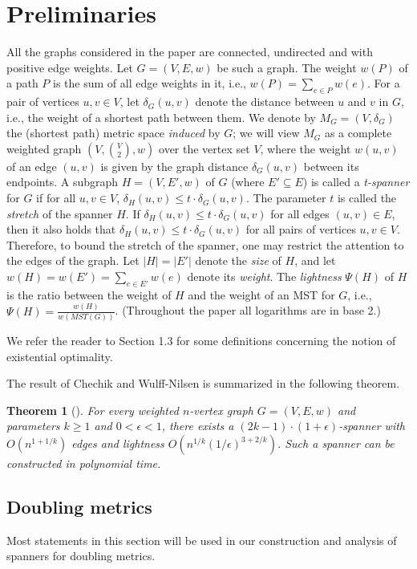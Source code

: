 \documentclass[11pt,letterpaper]{article}
\newtheorem{theorem}{Theorem}
\newcommand{\eps}{\epsilon}
\begin{document}
\section{Preliminaries}\label{sec:pre}
All the graphs considered in the paper are connected, undirected and with positive edge weights. Let $G=(V,E,w)$ be such a graph.
The weight $w(P)$ of a path $P$ is the sum of all edge weights in it, i.e., $w(P) = \sum_{e \in P} w(e)$.
For a pair of vertices $u,v \in V$, let $\delta_G(u,v)$ denote the distance between $u$ and $v$ in $G$, i.e., the weight of a shortest path between them.
We denote by $M_G = (V,\delta_G)$ the (shortest path) metric space \emph{induced} by $G$; we will view $M_G$ as a complete weighted graph $(V, {V \choose 2},w)$ over the vertex set $V$,
where the weight $w(u,v)$ of an edge $(u,v)$ is given by the graph distance $\delta_G(u,v)$ between its endpoints.
A subgraph $H=(V,E',w)$ of $G$ (where $E'\subseteq E$) is called a \emph{t-spanner} for $G$ if for all $u,v \in V$,  $\delta_H(u,v)\le t\cdot \delta_G(u,v)$.
The parameter $t$ is called the \emph{stretch} of the spanner $H$.
If $\delta_H(u,v)\le t\cdot \delta_G(u,v)$ for all edges $(u,v) \in E$, then
it also holds that $\delta_H(u,v)\le t\cdot \delta_G(u,v)$ for all pairs of vertices $u,v \in V$.
Therefore, to bound the stretch of the spanner, one may restrict the attention to the edges of the graph.
Let $|H| = |E'|$ denote the \emph{size} of $H$, and let $w(H) = w(E') = \sum_{e\in E'}w(e)$ denote its \emph{weight}.
The \emph{lightness} $\Psi(H)$ of $H$ is the ratio between the weight of $H$ and the weight of an MST for $G$, i.e., $\Psi(H)=\frac{w(H)}{w(MST(G))}$.
(Throughout the paper all logarithms are in base 2.)

We refer the reader to Section 1.3 for some definitions concerning the notion of existential optimality.



The result of  Chechik and Wulff{-}Nilsen \cite{CW18} is summarized in the following theorem.
\begin{theorem}[\cite{CW18}]\label{thm:CW18}
	For every weighted $n$-vertex graph $G=(V,E,w)$ and parameters $k\ge 1$ and $0<\epsilon<1$, there exists a
	$(2k-1)\cdot(1+\epsilon)$-spanner with $O(n^{1+1/k})$ edges and lightness $O(n^{1/k} (1/\eps)^{3+2/k})$. Such a spanner can be constructed in polynomial time.
\end{theorem}	

\subsection{Doubling metrics}\label{sebsec:DoublingPreliminaries}
Most statements in this section will be used in our construction and analysis of spanners for doubling metrics. 
\end{document}
